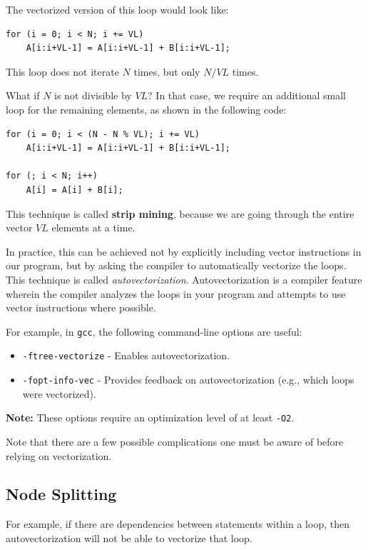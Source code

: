 \documentclass[12pt]{book}
\begin{document}
The vectorized version of this loop would look like:

\begin{lstlisting}[style=cppstyle]
for (i = 0; i < N; i += VL)
    A[i:i+VL-1] = A[i:i+VL-1] + B[i:i+VL-1];
\end{lstlisting}

This loop does not iterate $N$ times, but only $N/VL$ times. 

What if $N$ is not divisible by $VL$? In that case, we require an additional small loop for the remaining elements, as shown in the following code:

\begin{lstlisting}[style=cppstyle]
for (i = 0; i < (N - N % VL); i += VL)
    A[i:i+VL-1] = A[i:i+VL-1] + B[i:i+VL-1];

for (; i < N; i++)
    A[i] = A[i] + B[i];
\end{lstlisting}

This technique is called \textbf{strip mining}, because we are going through the entire vector $VL$ elements at a time.

In practice, this can be achieved not by explicitly including vector instructions in our program, but by asking the compiler to automatically vectorize the loops. This technique is called \textit{autovectorization}. Autovectorization is a compiler feature wherein the compiler analyzes the loops in your program and attempts to use vector instructions where possible.

For example, in \texttt{gcc}, the following command-line options are useful:
\begin{itemize}
    \item \texttt{-ftree-vectorize} - Enables autovectorization.
    \item \texttt{-fopt-info-vec} - Provides feedback on autovectorization (e.g., which loops were vectorized).
\end{itemize}

\noindent \textbf{Note:} These options require an optimization level of at least \texttt{-O2}.

Note that there are a few possible complications one must be aware of before relying on vectorization.

\subsection{Node Splitting}
For example, if there are dependencies between statements within a loop, then autovectorization will not be able to vectorize that loop.
\end{document}

